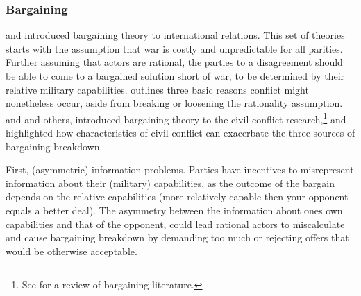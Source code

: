 \subsubsection{Bargaining} \label{Bargaining}


\citet{Fearon1995} and \citet{Powell2006} introduced bargaining theory to
international relations. This set of theories starts with the assumption that
war is costly and unpredictable for all parities. Further assuming that actors
are rational, the parties to a disagreement should be able to come to a
bargained solution short of war, to be determined by their relative military
capabilities. \citet{Fearon1995} outlines three basic reasons
conflict might nonetheless occur, aside from breaking or loosening the
rationality assumption. \citet{Pillar_1983} and \citet{WalterBarbaraF2002CtPT,
Walter_1997} and others, introduced bargaining theory to the civil conflict
research,\footnote{See \citet{Walter2009} for a review of bargaining
literature.} and highlighted how characteristics of civil conflict can
exacerbate the three sources of bargaining breakdown.

First, (asymmetric) information problems. Parties have incentives to
misrepresent information about their (military) capabilities, as the outcome of
the bargain depends on the relative capabilities (more relatively capable then
your opponent equals a better deal). The asymmetry between the information about
ones own capabilities and that of the opponent, could lead rational actors to
miscalculate and cause bargaining breakdown by demanding too much or rejecting
offers that would be otherwise acceptable.

